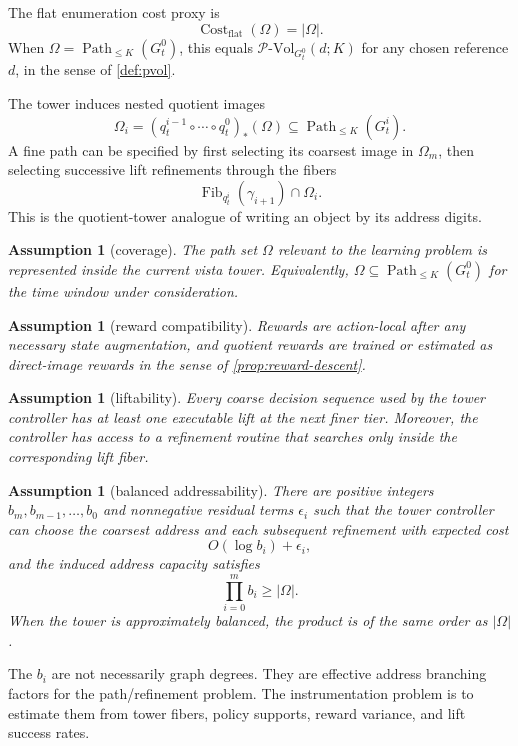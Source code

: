 \documentclass[11pt]{article}
\newtheorem{assumption}[definition]{Assumption}
\newcommand{\Path}{\operatorname{Path}}
\newcommand{\PVol}{\mathcal{P}\text{-}\mathrm{Vol}}
\newcommand{\cost}{\operatorname{Cost}}
\newcommand{\fiber}{\operatorname{Fib}}
\begin{document}
The flat enumeration cost proxy is
\[
    \cost_{\mathrm{flat}}(\Omega)=|\Omega|.
\]
When \(\Omega=\Path_{\le K}(G^0_t)\), this equals \(\PVol_{G^0_t}(d;K)\) for any chosen reference \(d\), in the sense of \cref{def:pvol}.

The tower induces nested quotient images
\[
    \Omega_i=(q^{i-1}_t\circ\cdots\circ q^0_t)_*(\Omega)
    \subseteq \Path_{\le K}(G^i_t).
\]
A fine path can be specified by first selecting its coarsest image in \(\Omega_m\), then selecting successive lift refinements through the fibers
\[
    \fiber_{q^i_t}(\gamma_{i+1})\cap \Omega_i.
\]
This is the quotient-tower analogue of writing an object by its address digits.

\begin{assumption}[coverage]\label{ass:coverage}
The path set \(\Omega\) relevant to the learning problem is represented inside the current vista tower.  Equivalently, \(\Omega\subseteq \Path_{\le K}(G^0_t)\) for the time window under consideration.
\end{assumption}

\begin{assumption}[reward compatibility]\label{ass:reward-compat}
Rewards are action-local after any necessary state augmentation, and quotient rewards are trained or estimated as direct-image rewards in the sense of \cref{prop:reward-descent}.
\end{assumption}

\begin{assumption}[liftability]\label{ass:liftability}
Every coarse decision sequence used by the tower controller has at least one executable lift at the next finer tier.  Moreover, the controller has access to a refinement routine that searches only inside the corresponding lift fiber.
\end{assumption}

\begin{assumption}[balanced addressability]\label{ass:balanced}
There are positive integers \(b_m,b_{m-1},\ldots,b_0\) and nonnegative residual terms \(\epsilon_i\) such that the tower controller can choose the coarsest address and each subsequent refinement with expected cost
\[
    O(\log b_i)+\epsilon_i,
\]
and the induced address capacity satisfies
\[
    \prod_{i=0}^{m} b_i \ge |\Omega|.
\]
When the tower is approximately balanced, the product is of the same order as \(|\Omega|\).
\end{assumption}

The \(b_i\) are not necessarily graph degrees.  They are effective address branching factors for the path/refinement problem.  The instrumentation problem is to estimate them from tower fibers, policy supports, reward variance, and lift success rates.
\end{document}
